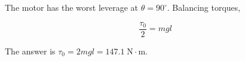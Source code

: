 \begin{solution}
    The motor has the worst leverage at $\theta=90^{\circ}$. Balancing torques,

    $$\frac{\tau_0}{2}=mgl$$

    The answer is $\boxed{\tau_0=2mgl=147.1\;\mathrm{N\cdot m}}$.
\end{solution}